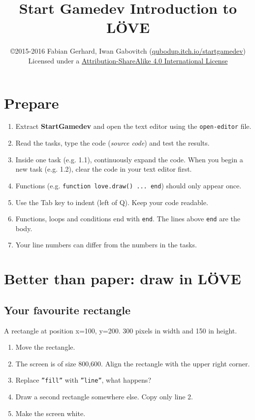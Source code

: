 \documentclass[a4paper, 11pt]{article}
\date{\vspace{-5ex}}
\title{\vspace{-8ex}Start Gamedev Introduction to LÖVE\vspace{-1ex}}
\author{\copyright{}2015-2016 Fabian Gerhard, Iwan Gabovitch (\href{http://qubodup.itch.io/startgamedev}{qubodup.itch.io/startgamedev})\\
Licensed under a \href{http://creativecommons.org/licenses/by-sa/4.0/}{Attribution-ShareAlike 4.0 International License}}
\begin{document}
\maketitle
\thispagestyle{fancy} %

\section{Prepare}

\begin{enumerate}
  \item Extract \textbf{StartGamedev} and open the text editor using the \texttt{open-editor} file.
  \item Read the tasks, type the code (\textit{source code}) and test the results.
  \item Inside one task (e.g. 1.1), continuously expand the code. When you begin a new task (e.g. 1.2), clear the code in your text editor first.
  \item Functions (e.g. \texttt{function love.draw() ... end}) should only appear once.
  \item Use the Tab key to indent (left of Q). Keep your code readable.
  \item Functions, loops and conditions end with \texttt{\texttt{end}}. The lines above \texttt{\texttt{end}} are the body.
  \item Your line numbers can differ from the numbers in the tasks.
\end{enumerate}

\section{Better than paper: draw in LÖVE}

\subsection{Your favourite rectangle}

A rectangle at position x=100, y=200. 300 pixels in width and 150 in height.


\begin{enumerate} 
\item Move the rectangle.
\item The screen is of size 800,600. Align the rectangle with the upper right corner. 
\item Replace \texttt{''fill''} with \texttt{''line''}, what happens?
\item Draw a second rectangle somewhere else. Copy only line 2.
\item Make the screen white.
\end{enumerate}
\end{document}
